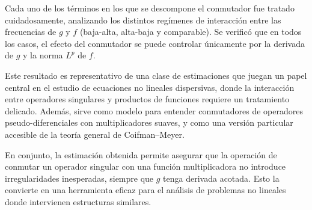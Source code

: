 \documentclass{aleph-revista}
\begin{document}
Cada uno de los términos en los que se descompone el conmutador fue tratado cuidadosamente, analizando los distintos regímenes de interacción entre las frecuencias de $g$ y $f$ (baja-alta, alta-baja y comparable). Se verificó que en todos los casos, el efecto del conmutador se puede controlar únicamente por la derivada de $g$ y la norma $L^p$ de $f$.

Este resultado es representativo de una clase de estimaciones que juegan un papel central en el estudio de ecuaciones no lineales dispersivas, donde la interacción entre operadores singulares y productos de funciones requiere un tratamiento delicado. Además, sirve como modelo para entender conmutadores de operadores pseudo-diferenciales con multiplicadores suaves, y como una versión particular accesible de la teoría general de Coifman–Meyer.

En conjunto, la estimación obtenida permite asegurar que la operación de conmutar un operador singular con una función multiplicadora no introduce irregularidades inesperadas, siempre que $g$ tenga derivada acotada. Esto la convierte en una herramienta eficaz para el análisis de problemas no lineales donde intervienen estructuras similares.
\newpage
\nocite{*}
\printbibliography
\end{document}

